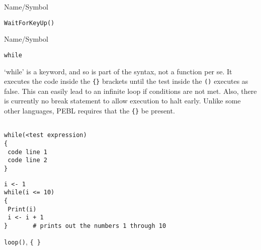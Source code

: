 \rl


\begin{desc}{Name/Symbol}
\item[Name/Symbol] 	\verb+WaitForKeyUp()+

\item[Description]	

\item[Usage]		

\item[Example]	

\item[See Also]	
\end{desc}

\rl


\begin{desc}{Name/Symbol}
\item[Name/Symbol]	\verb+while+

\item[Description] `while' is a keyword, and so is part of the syntax,
  not a function per se.  It executes the code inside the \verb+{}+
  brackets until the test inside the \verb+()+ executes as false.
  This can easily lead to an infinite loop if conditions are not met.
  Also, there is currently no break statement to allow execution to
  halt early.  Unlike some other languages, PEBL requires that the
  \verb+{}+ be present.

\item[Usage]
\begin{verbatim}

while(<test expression)
{
 code line 1
 code line 2
}
\end{verbatim}

\item[Example] 
\begin{verbatim}
i <- 1
while(i <= 10)
{
 Print(i)
 i <- i + 1
}		# prints out the numbers 1 through 10
\end{verbatim}

\item[See Also] 	\verb+loop()+, \verb+{ }+


\end{desc}

\rl


